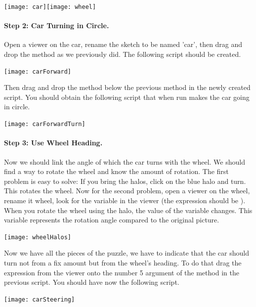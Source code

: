 \begin{center}\texttt{[image: car]}\hspace{1cm}\texttt{[image: wheel]}\end{center}

\paragraph{Step 2: Car Turning in Circle.} Open a viewer on the car, rename the sketch to be named 'car',  then drag and drop
the method  as we previously did. The following script  should be created.
\begin{center}\texttt{[image: carForward]}\end{center}
Then drag and drop the method  below the previous method in the newly created script. You should obtain the 
following script that when run makes the car going in circle. 
\begin{center}\texttt{[image: carForwardTurn]}\end{center}

\paragraph{Step 3: Use Wheel Heading.}
Now we should link the angle of which the car turns with the wheel. We should find a way to rotate the wheel and know the amount of rotation. The first problem is easy to solve: If you bring the halos, click on the blue halo and turn. This rotates the wheel.
Now for the second problem, open a viewer on the wheel, rename it wheel,  look for the  variable in the viewer  (the expression should be ). When you rotate the wheel using the halo, the value of the variable changes. This variable represents the rotation angle compared to the original picture.

\begin{center}\texttt{[image: wheelHalos]}\end{center}

Now we have all the pieces of the puzzle, we have to indicate that the car should turn not from a fix amount but
from the wheel's heading. To do that drag the expression  from the viewer onto the number 5 argument of the 
 method in the previous script. You should have now the following script. 
\begin{center}\texttt{[image: carSteering]}\end{center}

